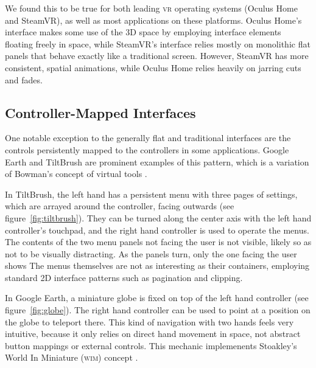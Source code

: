 \documentclass[nobib]{tufte-book} %
\begin{document}
We found this to be true for both leading \textsc{vr} operating systems (Oculus Home and SteamVR), as well as most applications on these platforms. Oculus Home's interface makes some use of the 3D space by employing interface elements floating freely in space, while SteamVR's interface relies mostly on monolithic flat panels that behave exactly like a traditional screen. However, SteamVR has more consistent, spatial animations, while Oculus Home relies heavily on jarring cuts and fades.


\subsection{Controller-Mapped Interfaces}
One notable exception to the generally flat and traditional interfaces are the controls persistently mapped to the controllers in some applications. Google Earth and TiltBrush are prominent examples of this pattern, which is a variation of Bowman's concept of virtual tools \cite[-1cm]{bowman1995user}.

In TiltBrush, the left hand has a persistent menu with three pages of settings, which are arrayed around the controller, facing outwards (see figure~\ref{fig:tiltbrush}). They can be turned along the center axis with the left hand controller's touchpad, and the right hand controller is used to operate the menus.
The contents of the two menu panels not facing the user is not visible, likely so as not to be visually distracting. As the panels turn, only the one facing the user shows
The menus themselves are not as interesting as their containers, employing standard 2D interface patterns such as pagination and clipping.

In Google Earth, a miniature globe is fixed on top of the left hand controller (see figure~\ref{fig:globe}). The right hand controller can be used to point at a position on the globe to teleport there. This kind of navigation with two hands feels very intuitive, because it only relies on direct hand movement in space, not abstract button mappings or external controls. This mechanic implemenents Stoakley's World In Miniature (\textsc{wim}) concept \cite[-2cm]{stoakley1995virtual}.
\end{document}
